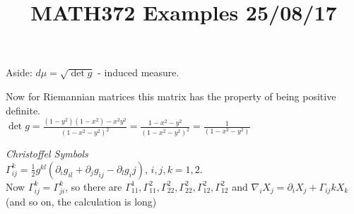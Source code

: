 \documentclass[11pt]{article}
\title{MATH372 Examples	 25/08/17}
\author{}
\date{}
\theoremstyle{thm}
\newcommand{\vpi}[0]{\medskip \par \noindent}
\begin{document}
\maketitle
Aside: $d \mu = \sqrt{\det{g}}$ - induced measure.\\
\vpi
Now for Riemannian matrices this matrix has the property of being positive definite.\\[1em]
$\det{g}=\displaystyle\frac{(1-y^2)(1-x^2)-x^2 y^2}{(1-x^2-y^2)^2}=\displaystyle\frac{1-x^2-y^2}{(1-x^2-y^2)^2}=\displaystyle\frac{1}{(1-x^2-y^2)}$\\
\vpi
\textit{Christoffel Symbols}\\
$\Gamma_{ij}^k = \displaystyle\frac{1}{2}g^{kl}(\partial_i g_{il}+\partial_j g_{ij} - \partial_l g_ij)$, $i,j,k = 1,2.$\\[1em]
Now $\Gamma_{ij}^{k}=\Gamma_{ji}^{k}$, so there are $\Gamma_{11}^{1}, \Gamma_{11}^{2}, \Gamma_{22}^{2}, \Gamma_{22}^{2}, \Gamma_{12}^{2}, \Gamma_{12}^{2}$ and
$\nabla_i X_j = \partial_i X_j + \Gamma_{ij}{k}X_k$\\
(and so on, the calculation is long)
\end{document}
